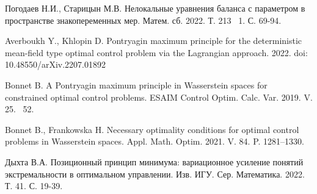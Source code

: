 \begin{thebibliography}{9} %

 Погодаев Н.И., Старицын М.В. Нелокальные уравнения баланса с параметром в пространстве знакопеременных мер. Матем. сб. 2022. Т. 213 \textnumero~1. С. 69-94.

 Averboukh Y., Khlopin D. Pontryagin maximum principle for the deterministic mean-field type optimal control problem via the Lagrangian approach. 2022. doi:
10.48550/arXiv.2207.01892

 Bonnet B. A Pontryagin maximum principle in Wasserstein spaces for constrained optimal control problems. ESAIM Control Optim. Calc. Var. 2019. V. 25.  \textnumero~52. 

 Bonnet B., Frankowska H. Necessary optimality conditions for optimal control problems in Wasserstein spaces. Appl. Math. Optim. 2021. V. 84. P. 1281--1330.

 Дыхта В.А. Позиционный принцип минимума: вариационное усиление понятий экстремальности в оптимальном управлении. Изв. ИГУ. Сер. Математика. 2022. Т. 41. С. 19-39.

\end{thebibliography}





%

